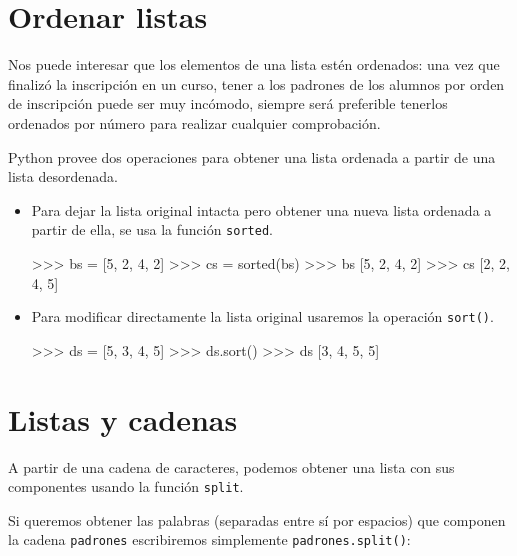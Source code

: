 

\section{Ordenar listas}
\label{ordenar}

Nos puede interesar que los elementos de una lista estén ordenados: una vez
que finalizó la inscripción en un curso, tener a los padrones de los
alumnos por orden de inscripción puede ser muy incómodo, siempre será
preferible tenerlos ordenados por número para realizar cualquier
comprobación.

Python provee dos operaciones para obtener una lista ordenada a partir de
una lista desordenada.

\begin{itemize}

\item Para dejar la lista original intacta pero obtener una nueva lista
ordenada a partir de ella, se usa la función \lstinline!sorted!.

\begin{codigo-python-sn}
>>> bs = [5, 2, 4, 2]
>>> cs = sorted(bs)
>>> bs
[5, 2, 4, 2]
>>> cs
[2, 2, 4, 5]
\end{codigo-python-sn}

\item Para modificar directamente la lista original usaremos la operación
\lstinline+sort()+.

\begin{codigo-python-sn}
>>> ds = [5, 3, 4, 5]
>>> ds.sort()
>>> ds
[3, 4, 5, 5]
\end{codigo-python-sn}

\end{itemize}

\section{Listas y cadenas}

A partir de una cadena de caracteres, podemos obtener una lista con sus
componentes usando la función \lstinline!split!.

Si queremos obtener las palabras (separadas entre sí por espacios) que
componen la cadena \lstinline!padrones! escribiremos simplemente
\lstinline!padrones.split()!:

